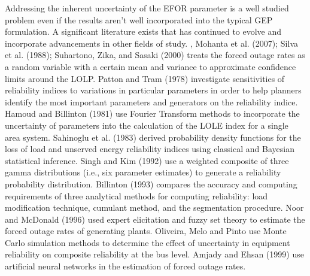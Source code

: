 \documentclass[10pt]{amsart}
\begin{document}
	Addressing the inherent uncertainty of the EFOR parameter is a well studied problem even if the results aren't well incorporated into the typical GEP formulation. 
	A significant literature exists that has continued to evolve and incorporate advancements in other fields of study. 
	\cite{barbosa:1977}, Mohanta et al. (2007); Silva et al. (1988); Suhartono, Zika, and Sasaki (2000) treats the forced outage rates as a random variable with a certain mean and variance to approximate confidence limits around the LOLP. 
	Patton and Tram (1978) investigate sensitivities of reliability indices to variations in particular parameters in order to help planners identify the most important parameters and generators on the reliability indice. 
	Hamoud and Billinton (1981) use Fourier Transform methods to incorporate the uncertainty of parameters into the calculation of the LOLE index for a single area system. 
	Sahinoglu et al. (1983) derived probability density functions for the loss of load and unserved energy reliability indices using classical and Bayesian statistical inference. 
	Singh and Kim (1992) use a weighted composite of three gamma distributions (i.e., six parameter estimates) to generate a reliability probability distribution. 
	Billinton (1993) compares the accuracy and computing requirements of three analytical methods for computing reliability: load modification technique, cumulant method, and the segmentation procedure. 
	Noor and McDonald (1996) used expert elicitation and fuzzy set theory to estimate the forced outage rates of generating plants. 
	Oliveira, Melo and Pinto use Monte Carlo simulation methods to determine the effect of uncertainty in equipment reliability on composite reliability at the bus level. 
	Amjady and Ehsan (1999) use artificial neural networks in the estimation of forced outage rates. 
\end{document}
